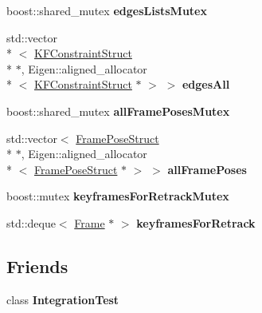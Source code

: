 \begin{DoxyCompactItemize}
\item 
\hypertarget{classlsd__slam_1_1_key_frame_graph_a3fcdb72f14397979e235c2e9ee2112ed}{boost\-::shared\-\_\-mutex {\bfseries edges\-Lists\-Mutex}}\label{classlsd__slam_1_1_key_frame_graph_a3fcdb72f14397979e235c2e9ee2112ed}

\item 
\hypertarget{classlsd__slam_1_1_key_frame_graph_a980d0a66a121b0616b273b5324a0c37e}{std\-::vector\\*
$<$ \hyperlink{structlsd__slam_1_1_k_f_constraint_struct}{K\-F\-Constraint\-Struct} \\*
$\ast$, Eigen\-::aligned\-\_\-allocator\\*
$<$ \hyperlink{structlsd__slam_1_1_k_f_constraint_struct}{K\-F\-Constraint\-Struct} $\ast$ $>$ $>$ {\bfseries edges\-All}}\label{classlsd__slam_1_1_key_frame_graph_a980d0a66a121b0616b273b5324a0c37e}

\item 
\hypertarget{classlsd__slam_1_1_key_frame_graph_a4cefb6b0075686d087b819a8458cce16}{boost\-::shared\-\_\-mutex {\bfseries all\-Frame\-Poses\-Mutex}}\label{classlsd__slam_1_1_key_frame_graph_a4cefb6b0075686d087b819a8458cce16}

\item 
\hypertarget{classlsd__slam_1_1_key_frame_graph_a9fe24ef732e68d2cc21efddcdf05e5ee}{std\-::vector$<$ \hyperlink{classlsd__slam_1_1_frame_pose_struct}{Frame\-Pose\-Struct} \\*
$\ast$, Eigen\-::aligned\-\_\-allocator\\*
$<$ \hyperlink{classlsd__slam_1_1_frame_pose_struct}{Frame\-Pose\-Struct} $\ast$ $>$ $>$ {\bfseries all\-Frame\-Poses}}\label{classlsd__slam_1_1_key_frame_graph_a9fe24ef732e68d2cc21efddcdf05e5ee}

\item 
\hypertarget{classlsd__slam_1_1_key_frame_graph_a0d165eb656f77b3737066a4cb855309b}{boost\-::mutex {\bfseries keyframes\-For\-Retrack\-Mutex}}\label{classlsd__slam_1_1_key_frame_graph_a0d165eb656f77b3737066a4cb855309b}

\item 
\hypertarget{classlsd__slam_1_1_key_frame_graph_a4c9313e998900b25bc1f1e090f0b1080}{std\-::deque$<$ \hyperlink{classlsd__slam_1_1_frame}{Frame} $\ast$ $>$ {\bfseries keyframes\-For\-Retrack}}\label{classlsd__slam_1_1_key_frame_graph_a4c9313e998900b25bc1f1e090f0b1080}

\end{DoxyCompactItemize}
\subsection*{Friends}
\begin{DoxyCompactItemize}
\item 
\hypertarget{classlsd__slam_1_1_key_frame_graph_a58b23779ede944b1716e0ffd20b379ae}{class {\bfseries Integration\-Test}}\label{classlsd__slam_1_1_key_frame_graph_a58b23779ede944b1716e0ffd20b379ae}

\end{DoxyCompactItemize}


